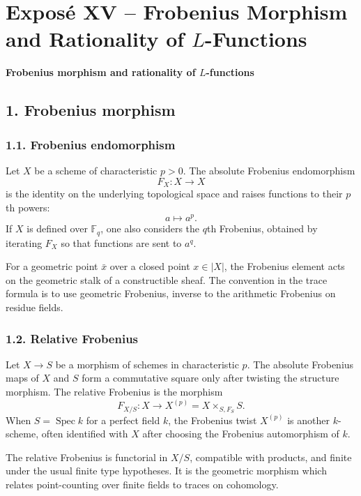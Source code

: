 \documentclass[11pt]{article}
\theoremstyle{plain}
\theoremstyle{definition}
\theoremstyle{remark}
\newcommand{\FF}{\mathbb F}
\DeclareMathOperator{\Spec}{Spec}
\begin{document}
\newpage

\section*{Expos\'e XV -- Frobenius Morphism and Rationality of $L$-Functions}

\begin{center}
\textbf{Frobenius morphism and rationality of $L$-functions}
\end{center}

\subsection*{1. Frobenius morphism}

\subsubsection*{1.1. Frobenius endomorphism}

Let $X$ be a scheme of characteristic $p>0$. The absolute Frobenius endomorphism
\[
   F_X:X\to X
\]
is the identity on the underlying topological space and raises functions to their $p$th powers:
\[
   a\longmapsto a^p.
\]
If $X$ is defined over $\FF_q$, one also considers the $q$th Frobenius, obtained by iterating $F_X$ so that functions are sent to $a^q$.

For a geometric point $\bar x$ over a closed point $x\in |X|$, the Frobenius element acts on the geometric stalk of a constructible sheaf. The convention in the trace formula is to use geometric Frobenius, inverse to the arithmetic Frobenius on residue fields.

\subsubsection*{1.2. Relative Frobenius}

Let $X\to S$ be a morphism of schemes in characteristic $p$. The absolute Frobenius maps of $X$ and $S$ form a commutative square only after twisting the structure morphism. The relative Frobenius is the morphism
\[
   F_{X/S}:X\to X^{(p)}=X\times_{S,F_S}S.
\]
When $S=\Spec k$ for a perfect field $k$, the Frobenius twist $X^{(p)}$ is another $k$-scheme, often identified with $X$ after choosing the Frobenius automorphism of $k$.

The relative Frobenius is functorial in $X/S$, compatible with products, and finite under the usual finite type hypotheses. It is the geometric morphism which relates point-counting over finite fields to traces on cohomology.
\end{document}
